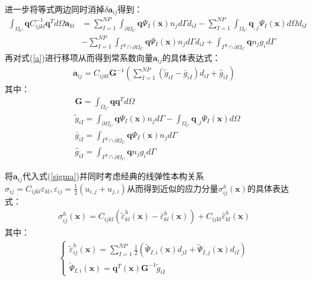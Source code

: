 进一步将等式两边同时消掉$\delta\pmb{a}_{ij}$得到：
\begin{equation}\label{a}
\begin{split}
        \int_{\Omega_C}\pmb{q}C^{-1}_{ijkl}\pmb{q}^Td\Omega\pmb{a}_{kl}&=\sum_{I=1}^{N\!P}\int_{\partial\Omega_C}\pmb{q}\Psi_I(\pmb{x})n_jd\Gamma d_{iI}-\sum_{I=1}^{N\!P}\int_{\Omega_C}\pmb{q}_{,j}\Psi_{I}(\pmb{x})d\Omega d_{iI}\\
         &-\sum_{I=1}^{N\!P}\int_{\Gamma^g\cap\partial\Omega_C}\pmb{q}\Psi_I(\pmb{x})n_jd\Gamma d_{iI}+\int_{\Gamma^g\cap\partial\Omega_C}\pmb{q}n_jg_id\Gamma
\end{split}
\end{equation}
再对式(\ref{a})进行移项从而得到常系数向量$\pmb{a}_{ij}$的具体表达式：
\begin{equation}\label{aij}
\begin{split}
 \pmb{a}_{ij}=C_{ijkl}\pmb{G}^{-1}(\sum_{I=1}^{N\!P}(\tilde{g}_{iI}-\bar{g}_{iI})d_{iI}+\hat{g}_{iI})
\end{split}
\end{equation}
其中：
\begin{align}
    \label{g1}&\pmb{G}=\int_{\Omega_C}\pmb{q}\pmb{q}^Td\Omega\\
    \label{g2} &\tilde{g}_{iI}=\int_{\partial\Omega_C}\pmb{q}\Psi_I(\pmb{x})n_jd\Gamma-\int_{\Omega_C}\pmb{q}_{,j}\Psi_{I}(\pmb{x})d\Omega\\
    \label{g3} &\bar{g}_{iI}=\int_{\Gamma^g\cap\partial\Omega_C}\pmb{q}\Psi_I(\pmb{x})n_jd\Gamma\\
   \label{g4} &\hat{g}_{iI}=\int_{\Gamma^g\cap\partial\Omega_C}\pmb{q}n_jg_id\Gamma
\end{align}\par
将$\pmb{a}_{ij}$代入式(\ref{sigma})并同时考虑经典的线弹性本构关系$\sigma_{ij}=C_{ijkl}\varepsilon_{kl},\varepsilon_{ij}=\frac{1}{2}(u_{i,j}+u_{j,i})$从而得到近似的应力分量$\sigma^h_{ij}(\pmb{x})$的具体表达式：
\begin{equation}\label{sigmah}
\begin{split}
    \sigma^h_{ij}(\pmb{x})=C_{ijkl}(\tilde{\varepsilon}^h_{kl}(\pmb{x})-\bar{\varepsilon}^h_{kl}(\pmb{x}))+C_{ijkl}\hat{\varepsilon}^h_{kl}(\pmb{x})
\end{split}
\end{equation}
其中：
\begin{equation}
\begin{split}
\begin{cases}\label{case1}
    \tilde{\varepsilon}^h_{ij}(\pmb{x})=\displaystyle\sum_{I=1}^{N\!P}\frac{1}{2}(\tilde{\Psi}_{I,i}(\pmb{x})d_{jI}+\tilde{\Psi}_{I,j}(\pmb{x})d_{iI})\\
    \tilde{\Psi}_{I,i}(\pmb{x})=\pmb{q}^T(\pmb{x})\pmb{G}^{-1}\tilde{g}_{iI}
\end{cases}
\end{split}
\end{equation}
